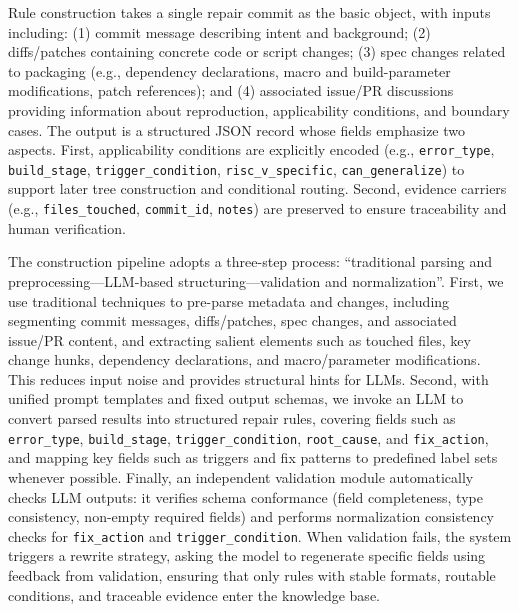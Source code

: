 \documentclass[sigconf,anonymous]{acmart}
\begin{document}
\begin{sloppypar}
Rule construction takes a single repair commit as the basic object, with inputs including: (1) commit message describing intent and background; (2) diffs/patches containing concrete code or script changes; (3) spec changes related to packaging (e.g., dependency declarations, macro and build-parameter modifications, patch references); and (4) associated issue/PR discussions providing information about reproduction, applicability conditions, and boundary cases. The output is a structured JSON record whose fields emphasize two aspects. First, applicability conditions are explicitly encoded (e.g., \texttt{error\_type}, \texttt{build\_stage}, \texttt{trigger\_condition}, \texttt{risc\_v\_specific}, \texttt{can\_generalize}) to support later tree construction and conditional routing. Second, evidence carriers (e.g., \texttt{files\_touched}, \texttt{commit\_id}, \texttt{notes}) are preserved to ensure traceability and human verification.
\end{sloppypar}

\begin{sloppypar}
The construction pipeline adopts a three-step process: ``traditional parsing and preprocessing---LLM-based structuring---validation and normalization''. First, we use traditional techniques to pre-parse metadata and changes, including segmenting commit messages, diffs/patches, spec changes, and associated issue/PR content, and extracting salient elements such as touched files, key change hunks, dependency declarations, and macro/parameter modifications. This reduces input noise and provides structural hints for LLMs. Second, with unified prompt templates and fixed output schemas, we invoke an LLM to convert parsed results into structured repair rules, covering fields such as \texttt{error\_type}, \texttt{build\_stage}, \texttt{trigger\_condition}, \texttt{root\_cause}, and \texttt{fix\_action}, and mapping key fields such as triggers and fix patterns to predefined label sets whenever possible. Finally, an independent validation module automatically checks LLM outputs: it verifies schema conformance (field completeness, type consistency, non-empty required fields) and performs normalization consistency checks for \texttt{fix\_action} and \texttt{trigger\_condition}. When validation fails, the system triggers a rewrite strategy, asking the model to regenerate specific fields using feedback from validation, ensuring that only rules with stable formats, routable conditions, and traceable evidence enter the knowledge base.
\end{sloppypar}
\end{document}
